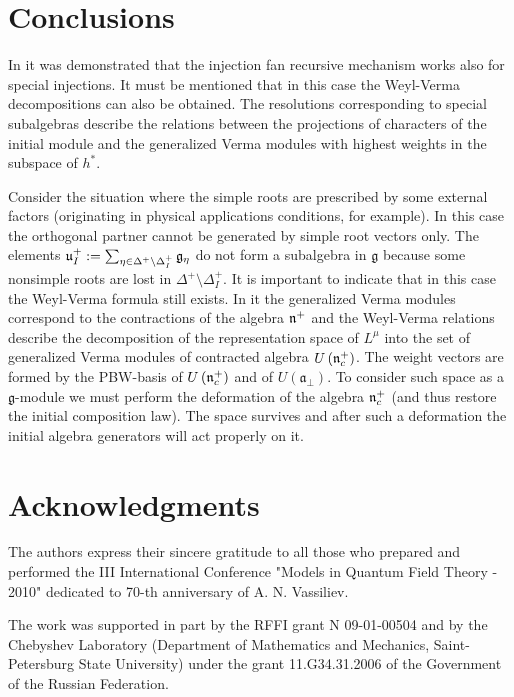 \documentclass[12pt]{article}
\theoremstyle{definition}
\begin{document}
\section{Conclusions}

\label{sec:conclusions}

In \cite{2010arXiv1007.0318L} it was demonstrated that the injection fan
recursive mechanism works also for special injections. It must be mentioned
that in this case the Weyl-Verma decompositions can also be obtained. The
resolutions corresponding to special subalgebras describe the relations
between the projections of characters of the initial module and the generalized
Verma modules with highest weights in the subspace of $h^*$.

Consider the situation where the simple roots are prescribed by some
external factors (originating in physical applications conditions, for
example). In this case the orthogonal partner cannot be generated by simple
root vectors only. The elements $\frak{u}_{I}^{+}:=\sum_{\eta \in \Delta
^{+}\setminus \Delta _{I}^{+}}\frak{g}_{\eta }$ do not form a subalgebra in $%
\mathfrak{g}$ because some nonsimple roots are lost in $\Delta ^{+}\setminus
\Delta _{I}^{+}$. It is important to indicate that in this case the
Weyl-Verma formula still exists. In it the generalized Verma modules
correspond to the contractions \cite{Doebner1967Melsheimer} of the algebra $%
\frak{n}^{+}$ and the Weyl-Verma relations describe the decomposition of
the representation space of $L^{\mu}$ into the set of generalized Verma
modules of contracted algebra $U\left(\frak{n}_c^{+}\right)$. The weight
vectors are formed by the PBW-basis of $U\left(\frak{n}_c^{+}\right)$ and of
$U\left( \mathfrak{a}_{\bot} \right)$. To consider such space as a $%
\mathfrak{g}$-module we must perform the deformation \cite
{Nijenhuis1966Richardson} of the algebra $\frak{n}_c^{+}$ (and thus restore the
initial composition law). The space survives and after such a deformation
the initial algebra generators will act properly on it.

\section{Acknowledgments}

The authors express their sincere gratitude to all those who prepared and
performed the III International Conference "Models in Quantum Field Theory -
2010" dedicated to 70-th anniversary of A. N. Vassiliev.

The work was supported in part by the RFFI grant N 09-01-00504 and by the Chebyshev Laboratory
(Department of Mathematics and Mechanics, Saint-Petersburg State
University) under the grant 11.G34.31.2006 of the Government of the
Russian Federation.




{}
\end{document}
